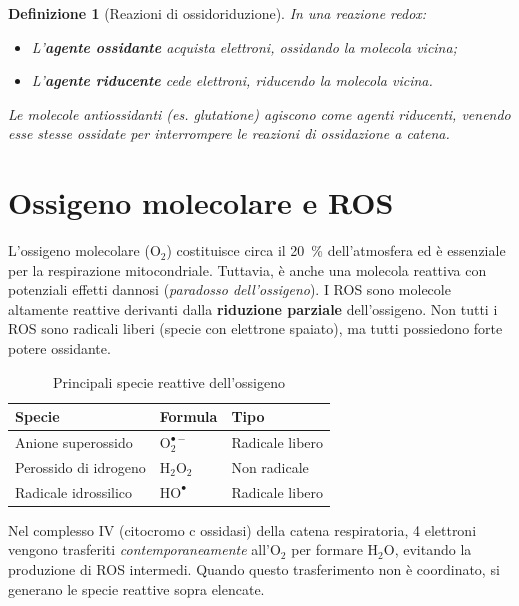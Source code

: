 \documentclass[12pt,a4paper]{report}
\newtheorem{definizione}{Definizione}[section]
\begin{document}
\begin{definizione}[Reazioni di ossidoriduzione]
In una reazione redox:
\begin{itemize}
\item L'\textbf{agente ossidante} acquista elettroni, ossidando la molecola vicina;
\item L'\textbf{agente riducente} cede elettroni, riducendo la molecola vicina.
\end{itemize}
Le molecole antiossidanti (es. glutatione) agiscono come agenti riducenti, venendo esse stesse ossidate per interrompere le reazioni di ossidazione a catena.
\end{definizione}

\section{Ossigeno molecolare e ROS}
L'ossigeno molecolare (\(\mathrm{O_2}\)) costituisce circa il \SI{20}{\percent} dell'atmosfera ed è essenziale per la respirazione mitocondriale. Tuttavia, è anche una molecola reattiva con potenziali effetti dannosi (\textit{paradosso dell'ossigeno}).
I ROS sono molecole altamente reattive derivanti dalla \textbf{riduzione parziale} dell'ossigeno. Non tutti i ROS sono radicali liberi (specie con elettrone spaiato), ma tutti possiedono forte potere ossidante.

\begin{table}[htbp]
\centering
\caption{Principali specie reattive dell'ossigeno}
\label{tab:ros}
\renewcommand{\arraystretch}{1.2}
\begin{tabular}{@{} p{} p{} p{} @{}}
\toprule
\textbf{Specie} & \textbf{Formula} & \textbf{Tipo} \\
\midrule
Anione superossido & \(\mathrm{O_2^{\bullet-}}\) & Radicale libero \\
Perossido di idrogeno & \(\mathrm{H_2O_2}\) & Non radicale \\
Radicale idrossilico & \(\mathrm{HO^{\bullet}}\) & Radicale libero \\
\bottomrule
\end{tabular}
\end{table}

Nel complesso IV (citocromo c ossidasi) della catena respiratoria, 4 elettroni vengono trasferiti \textit{contemporaneamente} all'\(\mathrm{O_2}\) per formare \(\mathrm{H_2O}\), evitando la produzione di ROS intermedi. Quando questo trasferimento non è coordinato, si generano le specie reattive sopra elencate.
\end{document}
